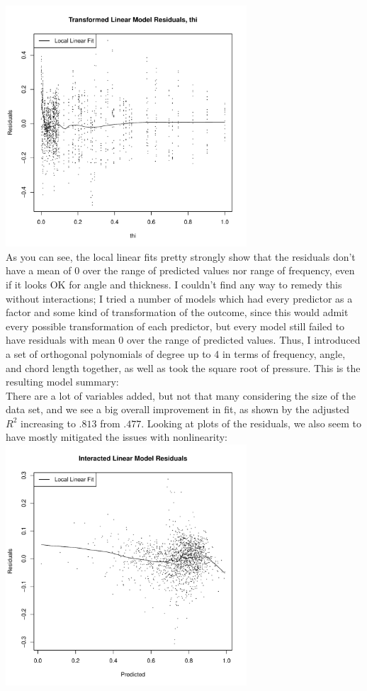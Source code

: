 \documentclass[11pt]{article}
\theoremstyle{definition}
\begin{document}
\begin{itemize}
\begin{itemize}
                \includegraphics[width=9cm]{final/1b_res_plot_tran_thi} \\ 
                As you can see, the local linear fits pretty strongly show that the residuals don't have a mean of $0$ over the range of predicted values nor range of frequency, even if it looks OK for angle and thickness. I couldn't find any way to remedy this without interactions; I tried a number of models which had every predictor as a factor and some kind of transformation of the outcome, since this would admit every possible transformation of each predictor, but every model still failed to have residuals with mean $0$ over the range of predicted values. Thus, I introduced a set of orthogonal polynomials of degree up to 4 in terms of frequency, angle, and chord length together, as well as took the square root of pressure. This is the resulting model summary: \\ 
                
                There are a lot of variables added, but not that many considering the size of the data set, and we see a big overall improvement in fit, as shown by the adjusted $R^2$ increasing to $.813$ from $.477$. Looking at plots of the residuals, we also seem to have mostly mitigated the issues with nonlinearity: \\
                \includegraphics[width=9cm]{final/1b_res_plot_int} 

\end{itemize}
\end{itemize}
\end{document}

